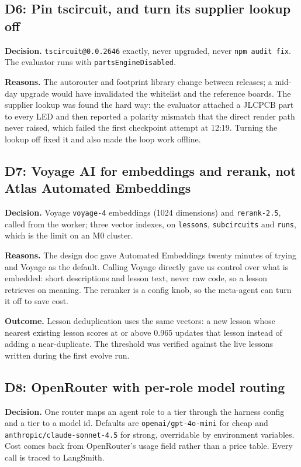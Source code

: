 \documentclass[11pt,a4paper]{article}
\newcommand{\code}[1]{\texttt{#1}}
\begin{document}
\subsection{D6: Pin tscircuit, and turn its supplier lookup off}

\textbf{Decision.} \code{tscircuit@0.0.2646} exactly, never upgraded, never \code{npm audit fix}. The evaluator runs with \code{partsEngineDisabled}.

\textbf{Reasons.} The autorouter and footprint library change between releases; a mid-day upgrade would have invalidated the whitelist and the reference boards. The supplier lookup was found the hard way: the evaluator attached a JLCPCB part to every LED and then reported a polarity mismatch that the direct render path never raised, which failed the first checkpoint attempt at 12:19. Turning the lookup off fixed it and also made the loop work offline.

\subsection{D7: Voyage AI for embeddings and rerank, not Atlas Automated Embeddings}

\textbf{Decision.} Voyage \code{voyage-4} embeddings (1024 dimensions) and \code{rerank-2.5}, called from the worker; three vector indexes, on \code{lessons}, \code{subcircuits} and \code{runs}, which is the limit on an M0 cluster.

\textbf{Reasons.} The design doc gave Automated Embeddings twenty minutes of trying and Voyage as the default. Calling Voyage directly gave us control over what is embedded: short descriptions and lesson text, never raw code, so a lesson retrieves on meaning. The reranker is a config knob, so the meta-agent can turn it off to save cost.

\textbf{Outcome.} Lesson deduplication uses the same vectors: a new lesson whose nearest existing lesson scores at or above 0.965 updates that lesson instead of adding a near-duplicate. The threshold was verified against the live lessons written during the first evolve run.

\subsection{D8: OpenRouter with per-role model routing}

\textbf{Decision.} One router maps an agent role to a tier through the harness config and a tier to a model id. Defaults are \code{openai/gpt-4o-mini} for cheap and \code{anthropic/claude-sonnet-4.5} for strong, overridable by environment variables. Cost comes back from OpenRouter's usage field rather than a price table. Every call is traced to LangSmith.
\end{document}
